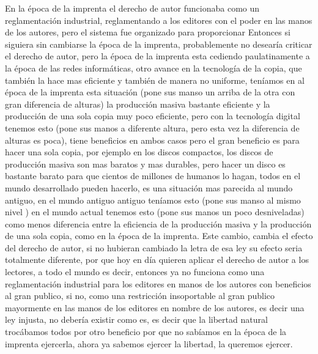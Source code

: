 \begin{multicols}{2}
En la época de la imprenta el derecho de autor funcionaba como un reglamentación industrial, reglamentando a los editores con el poder en las manos de los autores, pero el sistema fue organizado para proporcionar {\em {\color{introcolor}{ beneficios al gran publico }}}Entonces si siguiera sin cambiarse la época de la imprenta, probablemente no desearía criticar el derecho de autor, pero la época de la imprenta esta cediendo paulatinamente a la época de las redes informáticas, otro avance en la tecnología de la copia, que también la hace mas eficiente y también de manera no uniforme, teníamos en al época de la imprenta esta situación (pone sus manso un arriba de la otra con gran diferencia de alturas) la producción masiva bastante eficiente y la producción de una sola copia muy poco eficiente, pero con la tecnología digital tenemos esto (pone sus manos a diferente altura, pero esta vez la diferencia de alturas es poca), tiene beneficios en ambos casos pero el gran beneficio es para hacer una sola copia, por ejemplo en los discos compactos, los discos de producción masiva son mas baratos y mas durables, pero hacer un disco es bastante barato para que cientos de millones de humanos lo hagan, todos en el mundo desarrollado pueden hacerlo, es una situación mas parecida al mundo antiguo, en el mundo antiguo antiguo teníamos esto (pone sus manso al mismo nivel ) en el mundo actual tenemos esto (pone sus manos un poco desniveladas) como menos diferencia entre la eficiencia de la producción masiva y la producción de una sola copia, como en la época de la imprenta. 
Este cambio, cambia el efecto del derecho de autor, si no hubieran cambiado la letra de esa ley su efecto seria totalmente diferente, por que hoy en día quieren aplicar el derecho de autor a los lectores, a todo el mundo es decir, entonces ya no funciona como una reglamentación industrial para los editores en manos de los autores con beneficios al gran publico, si no, como una restricción insoportable al gran publico mayormente en las manos de los editores en nombre de los autores, es decir una ley injusta, no debería existir como es, es decir que la libertad natural trocábamos todos por otro beneficio por que no sabíamos en la época de la imprenta ejercerla, ahora ya sabemos ejercer la libertad, la queremos ejercer.



\end{multicols}
